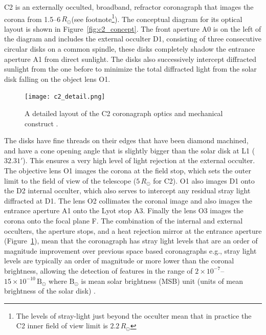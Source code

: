 C2 is an externally occulted, broadband, refractor coronagraph that images the corona from 1.5--6$\,R_{\odot}$(see footnote\footnote{The levels of stray-light just beyond the occulter mean that in practice the C2 inner field of view limit is $2.2\,R_{\odot}$}). The conceptual diagram for its optical layout is shown in Figure~\ref{fig:c2_concept}. The front aperture A0 is on the left of the diagram and includes the external occulter D1, consisting of three consecutive circular disks on a common spindle, these disks completely shadow the entrance aperture A1 from direct sunlight. The disks also successively intercept diffracted sunlight from the one before to minimize the total diffracted light from the solar disk falling on the object lens O1. 
\begin{figure}[!t]
\begin{center}
\texttt{[image: c2\_detail.png]}
\caption[The LASCO C2 coronagraph detail]{A detailed layout of the C2 coronagraph optics and mechanical construct \citep{bru95}.}
\label{fig:c2_detail}
\end{center}
\end{figure}
The disks have fine threads on their edges that have been diamond machined, and have a cone opening angle that is slightly bigger than the solar disk at L1 ($32.31'$). This ensures a very high level of light rejection at the external occulter. The objective lens O1 images the corona at the field stop, which sets the outer limit to the field of view of the telescope ($5\,R_{\odot}$ for C2). O1 also images D1 onto the D2 internal occulter, which also serves to intercept any residual stray light diffracted at D1. The lens O2 collimates the coronal image and also images the entrance aperture A1 onto the Lyot stop A3. Finally the lens O3 images the corona onto the focal plane F. The combination of the internal and external occulters, the aperture stops, and a heat rejection mirror at the entrance aperture (Figure~\ref{fig:c2_detail}), mean that the coronagraph has stray light levels that are an order of magnitude improvement over previous space based coronagraphs e.g., stray light levels are typically an order of magnitude or more lower than the coronal brightness, allowing the detection of features in the range of $2\times10^{-7}$--$15\times10^{-10}\,\mathrm{B}_{\odot}$ where $\mathrm{B}_{\odot}$ is mean solar brightness (MSB) unit (units of mean brightness of the solar disk) \citep{bru95}.

